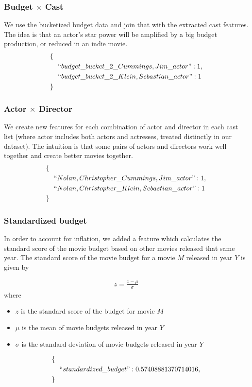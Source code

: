 \documentclass[journal]{IEEEtran}
\begin{document}
\subsubsection{Budget $\times$ Cast}
We use the bucketized budget data and join that with the extracted cast
features. The idea is that an actor's star power will be amplified by a big
budget production, or reduced in an indie movie.
\begin{align*}
        \{\ \ &\\
        &``budget\_bucket\_2\_Cummings,Jim\_actor": 1,\\
        &``budget\_bucket\_2\_Klein,Sebastian\_actor": 1\\
        \}\ \ &
\end{align*}

\subsubsection{Actor $\times$ Director}
We create new features for each combination of actor and director in each cast
list (where actor includes both actors and actresses, treated distinctly in our
dataset). The intuition is that some pairs of actors and directors work well
together and create better movies together.
\begin{align*}
        \{\ \ &\\
        &``Nolan,Christopher\_Cummings,Jim\_actor": 1,\\
        &``Nolan,Christopher\_Klein,Sebastian\_actor": 1\\
        \}\ \ &
\end{align*}

\subsubsection{Standardized budget}
In order to account for inflation, we added a feature which calculates the
standard score of the movie budget based on other movies released that same
year.  The standard score of the movie budget for a movie $M$ released in year
$Y$ is given by

\begin{eqnarray*}
    z = \frac{x - \mu}{\sigma}
\end{eqnarray*}
where
\begin{itemize}
    \item $z$ is the standard score of the budget for movie $M$
    \item $\mu$ is the mean of movie budgets released in year $Y$
    \item $\sigma$ is the standard deviation of movie budgets released in year $Y$
\end{itemize}
\begin{align*}
        \{\ \ &\\
        &``standardized\_budget": 0.57408881370714016,\\
        \}\ \ &
\end{align*}
\end{document}

